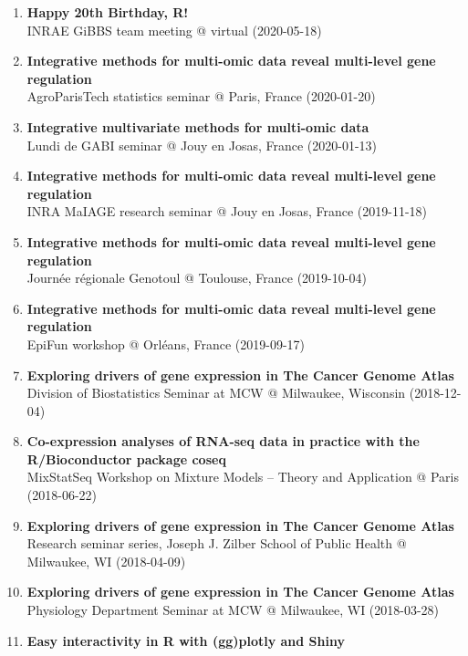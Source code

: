 \documentclass[11pt, a4paper]{awesome-cv}
\begin{document}
\begin{enumerate}
{  exploratory analyses}\\
  Grenoble Laboratoire Jean Kuntzmann seminar @ virtual (2021-04-29)
\item
  \textbf{Happy 20th Birthday, R!}\\
  INRAE GiBBS team meeting @ virtual (2020-05-18)
\item
  \textbf{Integrative methods for multi-omic data reveal multi-level
  gene regulation}\\
  AgroParisTech statistics seminar @ Paris, France (2020-01-20)
\item
  \textbf{Integrative multivariate methods for multi-omic data}\\
  Lundi de GABI seminar @ Jouy en Josas, France (2020-01-13)
\item
  \textbf{Integrative methods for multi-omic data reveal multi-level
  gene regulation}\\
  INRA MaIAGE research seminar @ Jouy en Josas, France (2019-11-18)
\item
  \textbf{Integrative methods for multi-omic data reveal multi-level
  gene regulation}\\
  Journée régionale Genotoul @ Toulouse, France (2019-10-04)
\item
  \textbf{Integrative methods for multi-omic data reveal multi-level
  gene regulation}\\
  EpiFun workshop @ Orléans, France (2019-09-17)
\item
  \textbf{Exploring drivers of gene expression in The Cancer Genome
  Atlas}\\
  Division of Biostatistics Seminar at MCW @ Milwaukee, Wisconsin
  (2018-12-04)
\item
  \textbf{Co-expression analyses of RNA-seq data in practice with the
  R/Bioconductor package coseq}\\
  MixStatSeq Workshop on Mixture Models -- Theory and Application @
  Paris (2018-06-22)
\item
  \textbf{Exploring drivers of gene expression in The Cancer Genome
  Atlas}\\
  Research seminar series, Joseph J. Zilber School of Public Health @
  Milwaukee, WI (2018-04-09)
\item
  \textbf{Exploring drivers of gene expression in The Cancer Genome
  Atlas}\\
  Physiology Department Seminar at MCW @ Milwaukee, WI (2018-03-28)
\item
  \textbf{Easy interactivity in R with (gg)plotly and Shiny}\\

\end{enumerate}
\end{document}
